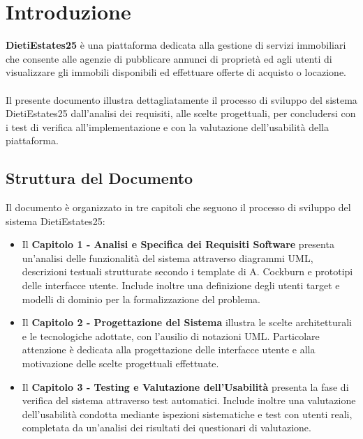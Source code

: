 \documentclass{book}
\begin{document}
\pagestyle{empty}
\makefrontpage
\pagestyle{headings}
\tableofcontents
\setcounter{chapter}{-1}

\chapter{Introduzione}

\textbf{DietiEstates25} è una piattaforma dedicata alla gestione di servizi immobiliari che consente alle agenzie di pubblicare annunci di proprietà ed agli utenti di visualizzare gli immobili disponibili ed effettuare offerte di acquisto o locazione.\\\\
Il presente documento illustra dettagliatamente il processo di sviluppo del sistema DietiEstates25 dall'analisi dei requisiti, alle scelte progettuali, per concludersi con i test di verifica all'implementazione e con la valutazione dell'usabilità della piattaforma.

\section{Struttura del Documento}

Il documento è organizzato in tre capitoli che seguono il processo di sviluppo del sistema DietiEstates25:

\begin{itemize}
    \item Il \textbf{Capitolo 1 - Analisi e Specifica dei Requisiti Software} presenta un'analisi delle funzionalità del sistema attraverso diagrammi UML, descrizioni testuali strutturate secondo i template di A. Cockburn e prototipi delle interfacce utente. Include inoltre una definizione degli utenti target e modelli di dominio per la formalizzazione del problema.

    \item Il \textbf{Capitolo 2 - Progettazione del Sistema} illustra le scelte architetturali e le tecnologiche adottate, con l'ausilio di notazioni UML. Particolare attenzione è dedicata alla progettazione delle interfacce utente e alla motivazione delle scelte progettuali effettuate.

    \item Il \textbf{Capitolo 3 - Testing e Valutazione dell'Usabilità} presenta la fase di verifica del sistema attraverso test automatici. Include inoltre una valutazione dell'usabilità condotta mediante ispezioni sistematiche e test con utenti reali, completata da un'analisi dei risultati dei questionari di valutazione.
\end{itemize}
\end{document}
